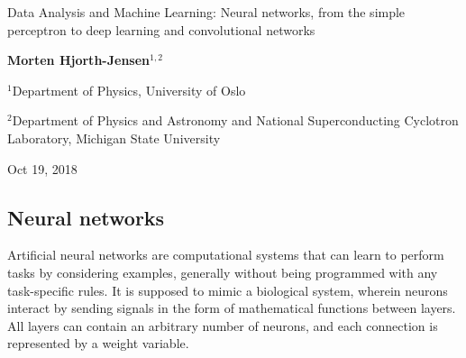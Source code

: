 \documentclass[%
oneside,                 %
final,                   %
10pt]{article}
\begin{document}

\newcommand{\exercisesection}[1]{\subsection*{#1}}






\thispagestyle{empty}

\begin{center}
{\LARGE\bf
\begin{spacing}{1.25}
Data Analysis and Machine Learning: Neural networks, from the simple perceptron to deep learning and convolutional networks
\end{spacing}
}
\end{center}


\begin{center}
{\bf Morten Hjorth-Jensen${}^{1, 2}$} \\ [0mm]
\end{center}

\begin{center}
\centerline{{\small ${}^1$Department of Physics, University of Oslo}}
\centerline{{\small ${}^2$Department of Physics and Astronomy and National Superconducting Cyclotron Laboratory, Michigan State University}}
\end{center}
    

\begin{center}
Oct 19, 2018
\end{center}

\vspace{1cm}


\subsection*{Neural networks}

Artificial neural networks are computational systems that can learn to
perform tasks by considering examples, generally without being
programmed with any task-specific rules. It is supposed to mimic a
biological system, wherein neurons interact by sending signals in the
form of mathematical functions between layers. All layers can contain
an arbitrary number of neurons, and each connection is represented by
a weight variable.
\end{document}
